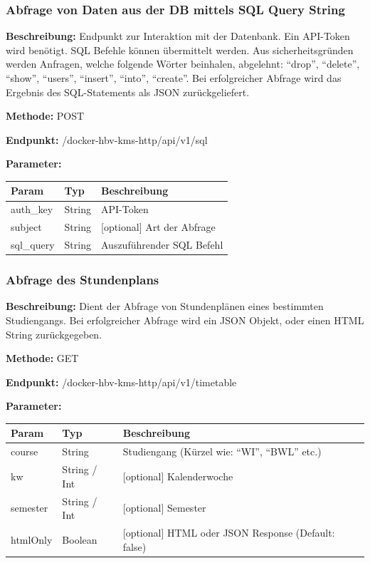 \subsubsection{Abfrage von Daten aus der DB mittels SQL Query String}
\label{sec:api-sql-query}
\textbf{Beschreibung:} Endpunkt zur Interaktion mit der Datenbank. Ein API-Token wird benötigt. SQL Befehle können
übermittelt werden. Aus sicherheitsgründen werden Anfragen, welche folgende Wörter beinhalen, abgelehnt:
``drop'', ``delete'', ``show'', ``users'', ``insert'', ``into'', ``create''. Bei erfolgreicher
Abfrage wird das Ergebnis des SQL-Statements als JSON zurückgeliefert.

\textbf{Methode:} POST

\textbf{Endpunkt:} /docker-hbv-kms-http/api/v1/sql

\textbf{Parameter:}
\begin{table}[H]
    \label{table:/docker-hbv-kms-http/api/v1/sql}
    \setlength{\tabcolsep}{3pt}
    \begin{tabular}{p{100pt}p{80pt}p{200pt}}
        \hline
        Param      & Typ    & Beschreibung               \\
        \hline
        auth\_key  & String & API-Token                  \\
        subject    & String & [optional] Art der Abfrage \\
        sql\_query & String & Auszuführender SQL Befehl  \\
        \hline
    \end{tabular}
\end{table}
\dotfill

\subsubsection{Abfrage des Stundenplans}
\label{sec:api-timetable}
\textbf{Beschreibung:} Dient der Abfrage von Stundenplänen eines bestimmten Studiengangs.
Bei erfolgreicher Abfrage wird ein JSON Objekt, oder einen HTML String zurückgegeben.

\textbf{Methode:} GET

\textbf{Endpunkt:} /docker-hbv-kms-http/api/v1/timetable

\textbf{Parameter:}
\begin{table}[H]
    \label{table:/docker-hbv-kms-http/api/v1/timetable}
    \setlength{\tabcolsep}{3pt}
    \begin{tabular}{p{100pt}p{80pt}p{200pt}}
        \hline
        Param    & Typ          & Beschreibung                                        \\
        \hline
        course   & String       & Studiengang (Kürzel wie: ``WI'', ``BWL'' etc.)      \\
        kw       & String / Int & [optional] Kalenderwoche                            \\
        semester & String / Int & [optional] Semester                                 \\
        htmlOnly & Boolean      & [optional] HTML oder JSON Response (Default: false) \\
        \hline
    \end{tabular}
\end{table}
\dotfill



